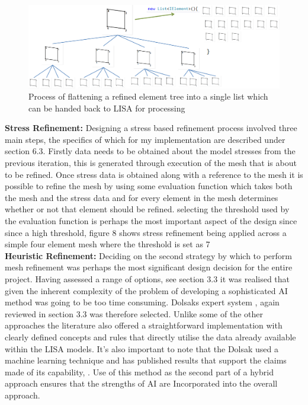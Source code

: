 \begin{figure}[!h]
  \centerline{\includegraphics[width=150mm, scale=1]{../Graphics/ElemFlattening.png}}
  \caption{Process of flattening a refined element tree into a single list which can be handed back to LISA for processing}
  \label{fig:h-refinementImp}
\end{figure}


\noindent
\textbf{Stress Refinement: }
Designing a stress based refinement process involved three main steps, the specifics of which for my implementation are described under section 6.3. Firstly data needs to be obtained about the model stresses from the previous iteration, this is generated through execution of the mesh that is about to be refined. Once stress data is obtained along with a reference to the mesh it is possible to refine the mesh by using some evaluation function which takes both the mesh and the stress data and for every element in the mesh determines whether or not that element should be refined. selecting the threshold used by the evaluation function is perhaps the most important aspect of the design since since a high threshold, figure 8 shows stress refinement being applied across a simple four element mesh where the threshold is set as 7 \\ 

\noindent
\textbf{Heuristic Refinement: } 
Deciding on the second strategy by which to perform mesh refinement was perhaps the most significant design decision for the entire project. Having assessed a range of options, see section 3.3 it was realised that given the inherent complexity of the problem of developing a sophisticated AI method was going to be too time consuming. Dolsaks expert system \cite{DolsakPaper91, DolsakPaper94}, again reviewed in section 3.3 was therefore selected. Unlike some of the other approaches the literature also offered a straightforward implementation with clearly defined concepts and rules that  directly utilise the data already available within the LISA models. It's also important to note that the Dolsak used a machine learning technique and has published results that support the claims made of its capability, \cite{DolsakPaper91, DolsakPaper94, appOfILPToFEMeshDesign}. Use of this method as the second part of a hybrid approach ensures that the strengths of AI are Incorporated into the overall approach.  \\

